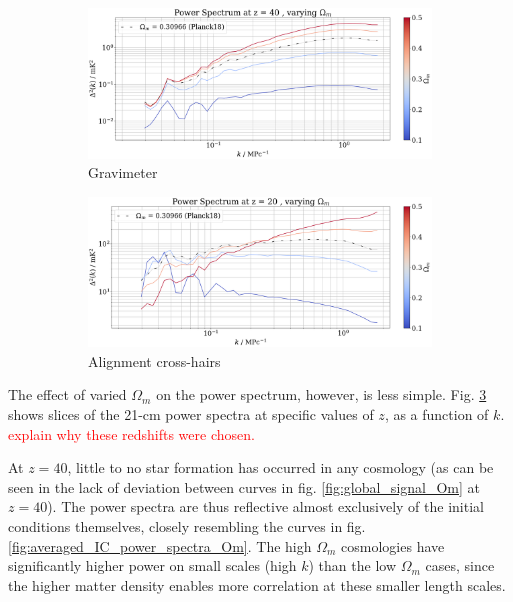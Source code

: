 \documentclass[floats,floatfix,showpacs,amssymb,prd,superscriptaddress,nofootinbib]{revtex4-2} %
\newcommand{\red}{\textcolor{red}}
\begin{document}
\begin{figure}[H]
     \centering
     \begin{subfigure}[b]{0.9\textwidth}
         \centering
         \includegraphics[width=\textwidth]{images/simulation_results/power_spectrum_fixed_z_40_Om.png}
         \caption{Gravimeter}
         \label{fig:IC_Om1}
     \end{subfigure}
     \hfill
     \begin{subfigure}[b]{0.9\textwidth}
         \centering
         \includegraphics[width=\textwidth]{images/simulation_results/power_spectrum_fixed_z_20_Om.png}
         \caption{Alignment cross-hairs}
         \label{fig:IC_Om5}
     \end{subfigure}
        \caption{}
        \label{fig:power_spectrum_fixed_z_Om}
\end{figure}

The effect of varied $\Omega_m$ on the power spectrum, however, is less simple. Fig. \ref{fig:power_spectrum_fixed_z_Om} shows slices of the 21-cm power spectra at specific values of $z$, as a function of $k$. \red{explain why these redshifts were chosen.}

At $z = 40$, little to no star formation has occurred in any cosmology (as can be seen in the lack of deviation between curves in fig. \ref{fig:global_signal_Om} at $z = 40$). The power spectra are thus reflective almost exclusively of the initial conditions themselves, closely resembling the curves in fig. \ref{fig:averaged_IC_power_spectra_Om}.
The high $\Omega_m$ cosmologies have significantly higher power on small scales (high $k$) than the low $\Omega_m$ cases, since the higher matter density enables more correlation at these smaller length scales. 
\end{document}
